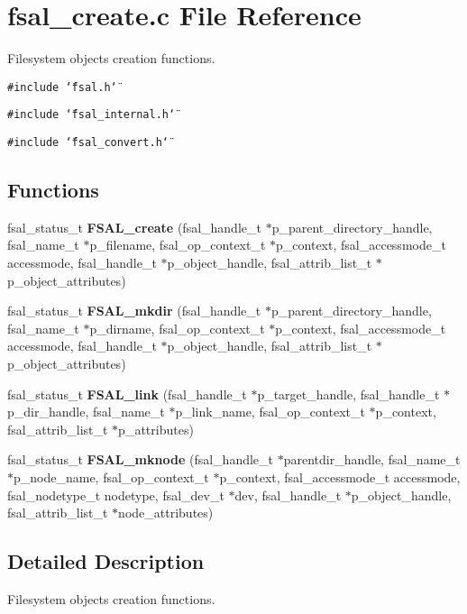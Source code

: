 \section{fsal\_\-create.c File Reference}
\label{fsal__create_8c}
Filesystem objects creation functions.  


{\tt \#include \char`\"{}fsal.h\char`\"{}}\par
{\tt \#include \char`\"{}fsal\_\-internal.h\char`\"{}}\par
{\tt \#include \char`\"{}fsal\_\-convert.h\char`\"{}}\par
\subsection*{Functions}
\begin{CompactItemize}
\item 
fsal\_\-status\_\-t {\bf FSAL\_\-create} (fsal\_\-handle\_\-t $\ast$p\_\-parent\_\-directory\_\-handle, fsal\_\-name\_\-t $\ast$p\_\-filename, fsal\_\-op\_\-context\_\-t $\ast$p\_\-context, fsal\_\-accessmode\_\-t accessmode, fsal\_\-handle\_\-t $\ast$p\_\-object\_\-handle, fsal\_\-attrib\_\-list\_\-t $\ast$p\_\-object\_\-attributes)
\item 
fsal\_\-status\_\-t {\bf FSAL\_\-mkdir} (fsal\_\-handle\_\-t $\ast$p\_\-parent\_\-directory\_\-handle, fsal\_\-name\_\-t $\ast$p\_\-dirname, fsal\_\-op\_\-context\_\-t $\ast$p\_\-context, fsal\_\-accessmode\_\-t accessmode, fsal\_\-handle\_\-t $\ast$p\_\-object\_\-handle, fsal\_\-attrib\_\-list\_\-t $\ast$p\_\-object\_\-attributes)
\item 
fsal\_\-status\_\-t {\bf FSAL\_\-link} (fsal\_\-handle\_\-t $\ast$p\_\-target\_\-handle, fsal\_\-handle\_\-t $\ast$p\_\-dir\_\-handle, fsal\_\-name\_\-t $\ast$p\_\-link\_\-name, fsal\_\-op\_\-context\_\-t $\ast$p\_\-context, fsal\_\-attrib\_\-list\_\-t $\ast$p\_\-attributes)
\item 
fsal\_\-status\_\-t {\bf FSAL\_\-mknode} (fsal\_\-handle\_\-t $\ast$parentdir\_\-handle, fsal\_\-name\_\-t $\ast$p\_\-node\_\-name, fsal\_\-op\_\-context\_\-t $\ast$p\_\-context, fsal\_\-accessmode\_\-t accessmode, fsal\_\-nodetype\_\-t nodetype, fsal\_\-dev\_\-t $\ast$dev, fsal\_\-handle\_\-t $\ast$p\_\-object\_\-handle, fsal\_\-attrib\_\-list\_\-t $\ast$node\_\-attributes)
\end{CompactItemize}


\subsection{Detailed Description}
Filesystem objects creation functions. 

